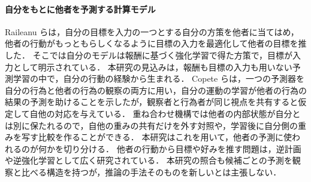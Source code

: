 \paragraph{自分をもとに他者を予測する計算モデル}
Raileanu ら\cite{raileanu2018modeling}は，自分の目標を入力の一つとする自分の方策を他者に当てはめ，他者の行動がもっともらしくなるように目標の入力を最適化して他者の目標を推した．
そこでは自分のモデルは報酬に基づく強化学習で得た方策で，目標が入力として明示されている．
本研究の見込みは，報酬も目標の入力も用いない予測学習の中で，自分の行動の経験から生まれる．
Copete ら\cite{copete2016motor}は，一つの予測器を自分の行為と他者の行為の観察の両方に用い，自分の運動の学習が他者の行為の結果の予測を助けることを示したが，観察者と行為者が同じ視点を共有すると仮定して自他の対応を与えている．
重ね合わせ機構では他者の内部状態が自分とは別に保たれるので，自他の重みの共有だけを外す対照や，学習後に自分側の重みを写す比較を作ることができる．
本研究はこれを用いて，他者の予測に使われるのが何かを切り分ける．
他者の行動から目標や好みを推す問題は，逆計画\cite{baker2009action,baker2017rational}や逆強化学習\cite{ng2000algorithms}として広く研究されている．
本研究の照合も候補ごとの予測を観察と比べる構造を持つが，推論の手法そのものを新しいとは主張しない．
